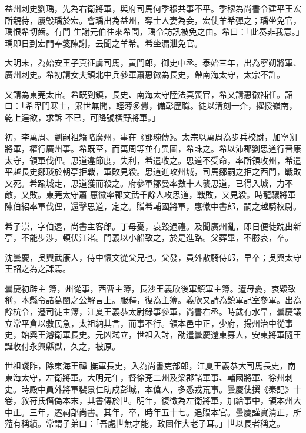 \begin{pinyinscope}
 益州刺史劉瑀，先為右衛將軍，與府司馬何季穆共事不平。季穆為尚書令建平王宏所親待，屢毀瑀於宏。會瑀出為益州，奪士人妻為妾，宏使羊希彈之；瑀坐免官，瑀恨希切齒。有門
 生謝元伯往來希間，瑀令訪訊被免之由。希曰：「此奏非我意。」瑀即日到宏門奉箋陳謝，云聞之羊希。希坐漏泄免官。



 大明末，為始安王子真征虜司馬，黃門郎，御史中丞。泰始三年，出為寧朔將軍、廣州刺史。希初請女夫鎮北中兵參軍蕭惠徽為長史，帶南海太守，太宗不許。



 又請為東莞太宙。希既到鎮，長史、南海太守陸法真喪官，希又請惠徽補任。詔曰：「希卑門寒士，累世無聞，輕薄多釁，備彰歷職。徒以清刻一介，擢授嶺南，乾上逞欲，求訴
 不已，可降號橫野將軍。」



 初，李萬周、劉嗣祖籍略廣州，事在《鄧琬傳》。太宗以萬周為步兵校尉，加寧朔將軍，權行廣州事。希既至，而萬周等並有異圖，希誅之。希以沛郡劉思道行晉康太守，領軍伐俚。思道違節度，失利，希遣收之。思道不受命，率所領攻州，希遣平越長史鄒琰於朝亭拒戰，軍敗見殺。思道進攻州城，司馬鄒嗣之拒之西門，戰敗又死。希踰城走，思道獲而殺之。府參軍鄒曼率數十人襲思道，已得入城，力不敵，又敗。東莞太守蕭
 惠徽率郡文武千餘人攻思道，戰敗，又見殺。時龍驤將軍陳伯紹率軍伐俚，還擊思道，定之。贈希輔國將軍，惠徽中書郎，嗣之越騎校尉。



 希子崇，字伯遠，尚書主客郎。丁母憂，哀毀過禮。及聞廣州亂，即日便徒跣出新亭，不能步涉，頓伏江渚。門義以小船致之，於是進路。父葬畢，不勝哀，卒。



 沈曇慶，吳興武康人，侍中懷文從父兄也。父發，員外散騎侍郎，早卒；吳興太守王韶之為之誄焉。



 曇慶初辟主
 簿，州從事，西曹主簿，長沙王義欣後軍鎮軍主簿。遭母憂，哀毀致稱，本縣令諸葛闡之公解言上。服釋，復為主簿。義欣又請為鎮軍記室參軍。出為餘杭令，遷司徒主簿，江夏王義恭太尉錄事參軍，尚書右丞。時歲有水旱，曇慶議立常平倉以救民急，太祖納其言，而事不行。領本邑中正，少府，揚州治中從事史，始興王濬衛軍長史。元凶弒立，世祖入討，劭遣曇慶還東募人，安東將軍隨王誕收付永興縣獄，久之，被原。



 世祖踐阼，除東海王禕
 撫軍長史，入為尚書吏部郎，江夏王義恭大司馬長史，南東海太守，左衛將軍。大明元年，督徐兗二州及梁郡諸軍事、輔國將軍、徐州刺史。時殿中員外將軍裴景仁助戍彭城，本傖人，多悉戎荒事。曇慶使撰《秦記》十卷，敘苻氏僭偽本末，其書傳於世。明年，復徵為左衛將軍，加給事中，領本州大中正。三年，遷祠部尚書。其年，卒，時年五十七。追贈本官。曇慶謹實清正，所蒞有稱績。常謂子弟曰：「吾處世無才能，政圖作大老子耳。」世以長者稱之。




\end{pinyinscope}
